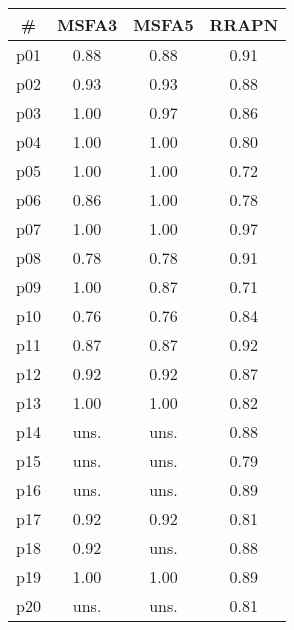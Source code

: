 \begin{tabular}{cccc}
\toprule
\textbf{\#} & \textbf{MSFA3} & \textbf{MSFA5} & \textbf{RRAPN}\\
\midrule
p01 & 0.88 & 0.88 & 0.91\\
p02 & 0.93 & 0.93 & 0.88\\
p03 & 1.00 & 0.97 & 0.86\\
p04 & 1.00 & 1.00 & 0.80\\
p05 & 1.00 & 1.00 & 0.72\\
p06 & 0.86 & 1.00 & 0.78\\
p07 & 1.00 & 1.00 & 0.97\\
p08 & 0.78 & 0.78 & 0.91\\
p09 & 1.00 & 0.87 & 0.71\\
p10 & 0.76 & 0.76 & 0.84\\
p11 & 0.87 & 0.87 & 0.92\\
p12 & 0.92 & 0.92 & 0.87\\
p13 & 1.00 & 1.00 & 0.82\\
p14 & uns. & uns. & 0.88\\
p15 & uns. & uns. & 0.79\\
p16 & uns. & uns. & 0.89\\
p17 & 0.92 & 0.92 & 0.81\\
p18 & 0.92 & uns. & 0.88\\
p19 & 1.00 & 1.00 & 0.89\\
p20 & uns. & uns. & 0.81\\
\bottomrule
\end{tabular}

